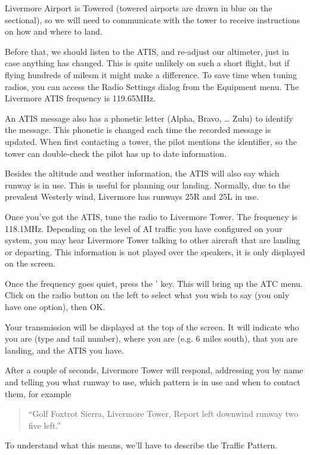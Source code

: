 Livermore Airport is Towered (towered airports are drawn in blue on the sectional), so we will need to communicate with the tower to receive instructions on how and where to land.

Before that, we should listen to the ATIS, and re-adjust our altimeter, just in case anything has changed. This is quite unlikely on such a short flight, but if flying hundreds of milesm it might make a difference. To save time when tuning radios, you can access the Radio Settings dialog from the Equipment menu. The Livermore ATIS frequency is 119.65MHz.

An ATIS message also has a phonetic letter (Alpha, Bravo, \ldots{} Zulu) to identify the message. This phonetic is changed each time the recorded message is updated. When first contacting a tower, the pilot mentions the identifier, so the tower can double-check the pilot has up to date information.

Besides the altitude and weather information, the ATIS will also say which runway is in use. This is useful for planning our landing. Normally, due to the prevalent Westerly wind, Livermore has runways 25R and 25L in use. 

Once you've got the ATIS, tune the radio to Livermore Tower. The frequency is 118.1MHz. Depending on the level of AI traffic you have configured on your system, you may hear Livermore Tower talking to other aircraft that are landing or departing. This information is not played over the speakers, it is only displayed on the screen.

Once the frequency goes quiet, press the ' key. This will bring up the ATC menu. Click on the radio button on the left to select what you wish to say (you only have one option), then OK.

Your transmission will be displayed at the top of the screen. It will indicate who you are (type and tail number), where you are (e.g. 6 miles south), that you are landing, and the ATIS you have.

After a couple of seconds, Livermore Tower will respond, addressing you by name and telling you what runway to use, which pattern is in use and when to contact them, for example 

\begin{quote}
``Golf Foxtrot Sierra, Livermore Tower, Report left downwind runway two five left.''
\end{quote}

To understand what this means, we'll have to describe the Traffic Pattern.

